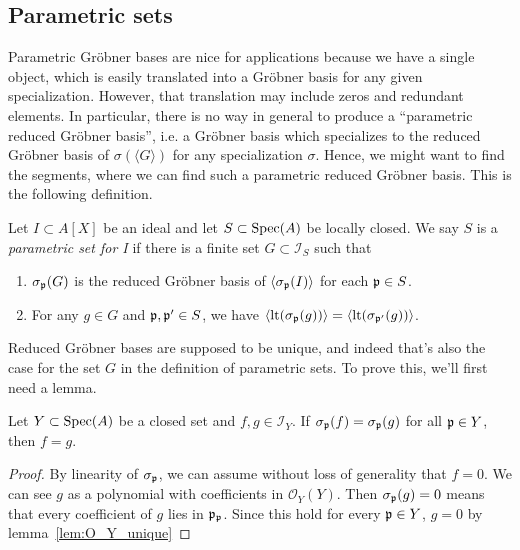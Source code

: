 \subsection{Parametric sets}
Parametric Gröbner bases are nice for applications because we have a single object, which is easily translated into a Gröbner basis for any given specialization. However, that translation may include zeros and redundant elements. In particular, there is no way in general to produce a ``parametric reduced Gröbner basis'', i.e. a Gröbner basis which specializes to the reduced Gröbner basis of $\sigma(\langle G \rangle)$ for any specialization $\sigma$. Hence, we might want to find the segments, where we can find such a parametric reduced Gröbner basis. This is the following definition.

\begin{definition}
  Let $I \subset A[X]$ be an ideal and let $S \subset \operatorname{Spec}(A)$ be locally closed. We say $S$ is a \textit{parametric set for I} if there is a finite set $G \subset \mathcal I_{S}$ such that
  \begin{enumerate}
    \item $\sigma_{\mathfrak p}(G)$ is the reduced Gröbner basis of $\langle \sigma_{\mathfrak p}(I) \rangle$ for each $\mathfrak p \in S$.
    \item For any $g \in G$ and $\mathfrak p, \mathfrak p' \in S$, we have $\langle \operatorname{lt}(\sigma_{\mathfrak p}(g)) \rangle = \langle \operatorname{lt}(\sigma_{\mathfrak p'}(g)) \rangle$.
  \end{enumerate}
\end{definition}

Reduced Gröbner bases are supposed to be unique, and indeed that's also the case for the set $G$ in the definition of parametric sets. To prove this, we'll first need a lemma.

\begin{lemma}\label{lem:parametric_grb_unique}
  Let $Y \subset \operatorname{Spec}(A)$ be a closed set and $f, g \in \mathcal I_{Y}$. If $\sigma_{\mathfrak p}(f) = \sigma_{\mathfrak p}(g)$ for all $\mathfrak p \in Y$, then $f = g$.
\end{lemma}
\begin{proof}
  By linearity of $\sigma_{\mathfrak p}$, we can assume without loss of generality that $f = 0$. We can see $g$ as a polynomial with coefficients in $\mathcal O_{Y}(Y)$. Then $\sigma_{\mathfrak p}(g) = 0$ means that every coefficient of $g$ lies in $\mathfrak p_{\mathfrak p}$. Since this hold for every $\mathfrak p \in Y$, $g = 0$ by lemma~\ref{lem:O_Y_unique}
\end{proof}

